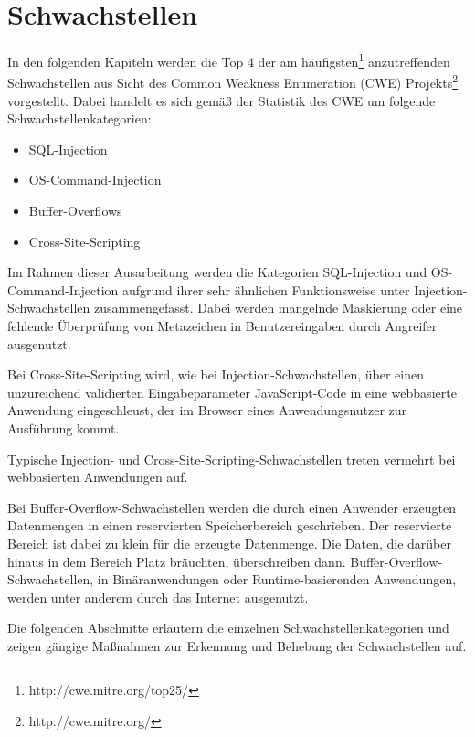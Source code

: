 \section{Schwachstellen}

In den folgenden Kapiteln werden die Top 4 der am häufigsten\footnote{http://cwe.mitre.org/top25/} 
anzutreffenden Schwachstellen aus Sicht des Common Weakness Enumeration (CWE) 
Projekts\footnote{http://cwe.mitre.org/} vorgestellt. Dabei handelt es sich 
gemäß der Statistik des CWE um folgende Schwachstellenkategorien:

\begin{itemize}
  \item SQL-Injection
  \item OS-Command-Injection
  \item Buffer-Overflows
  \item Cross-Site-Scripting
\end{itemize}

Im Rahmen dieser Ausarbeitung werden die Kategorien SQL-Injection und 
OS-Command-Injection aufgrund ihrer sehr ähnlichen Funktionsweise 
unter Injection-Schwachstellen zusammengefasst.
Dabei werden mangelnde Maskierung oder eine fehlende Überprüfung von Metazeichen 
in Benutzereingaben durch Angreifer ausgenutzt.

Bei Cross-Site-Scripting wird, wie bei Injection-Schwachstellen, 
über einen unzureichend validierten Eingabeparameter JavaScript-Code in 
eine webbasierte Anwendung eingeschleust, der im Browser eines 
Anwendungsnutzer zur Ausführung kommt.

Typische Injection- und Cross-Site-Scripting-Schwachstellen treten 
vermehrt bei webbasierten Anwendungen auf.

Bei Buffer-Overflow-Schwachstellen werden die durch einen Anwender erzeugten
Datenmengen in einen reservierten Speicherbereich geschrieben. 
Der reservierte Bereich ist dabei zu klein für die erzeugte Datenmenge.
Die Daten, die darüber hinaus in dem Bereich Platz bräuchten, überschreiben 
dann.  
Buffer-Overflow-Schwachstellen, in Binäranwendungen oder 
Runtime-basierenden Anwendungen, werden unter anderem durch das Internet 
ausgenutzt.

Die folgenden Abschnitte erläutern die einzelnen Schwachstellenkategorien 
und zeigen gängige Maßnahmen zur Erkennung und Behebung der Schwachstellen auf.



